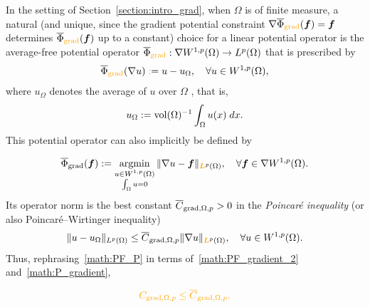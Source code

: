 \documentclass[10pt,letterpaper]{article}
\newcommand\cye[1]{%
  \protect\leavevmode
  \begingroup
    \color{red!35!yellow}%
    #1%
  \endgroup
}
\begin{document}
\cye{In the setting of Section~\ref{section:intro_grad}, when $\Omega$ is of finite measure,} a natural \cye{(and unique, since the gradient potential constraint $\nabla \overline \Phi_{\cye{\grad}}( \bff ) = \bff$ determines $\overline \Phi_{\cye{\grad}}( \bff )$ up to a constant)} choice \cye{for a linear potential operator} is the average-free potential operator $\overline\Phi_{\cye{\grad}} : \nabla W^{1,p}(\Omega) \rightarrow L^{p}(\Omega)$ that is prescribed by
\begin{align*}
    \overline\Phi_{\cye{\grad}}( \nabla u ) \cye{:}= u - u_{\Omega},
    \quad 
    \forall 
    u \in W^{1,p}(\Omega)
    ,
\end{align*}
where $u_\Omega$ denotes the average of $u$ \cye{over $\Omega$}, that is,
\begin{align*}
    u_{\Omega} := \operatorname{vol}(\Omega)^{-1} \int_{\Omega} u(x) \;dx.
\end{align*}
\cye{This potential operator can also implicitly be defined by}
\begin{align*}
    \overline \Phi_{\grad}( \bff ) 
    := 
    \argmin\limits_{ \substack{ u \in W^{1,p}(\Omega) \\ \int_\Omega u = 0 } } \| \nabla u - \bff \|_{\cye{\bfL}^{p}(\Omega)},
    \quad 
    \forall 
    \bff \in \nabla W^{1,p}(\Omega)
    .
\end{align*} 
Its operator norm is the \cye{best} constant $\overline C_{\operatorname{grad},\Omega,p} > 0$ in the {\em Poincar\'e inequality} (or also Poincar\'e--Wirtinger inequality)
\begin{align}\label{math:P_gradient}
    \| u - u_{\Omega} \|_{L^{p}(\Omega)}
    \leq 
    \overline C_{\grad,\Omega,p} \| \nabla u \|_{\cye{\bfL}^{p}(\Omega)},
    \quad 
    \forall 
    u \in W^{1,p}(\Omega)
    . 
\end{align}
\cye{Thus, rephrasing~\eqref{math:PF_P} in terms of~\eqref{math:PF_gradient_2} and~\eqref{math:P_gradient},} 
%
\begin{align*}
    \cye{C_{\grad,\Omega,p} \leq \overline C_{\grad,\Omega,p}.}
\end{align*}
\end{document}
